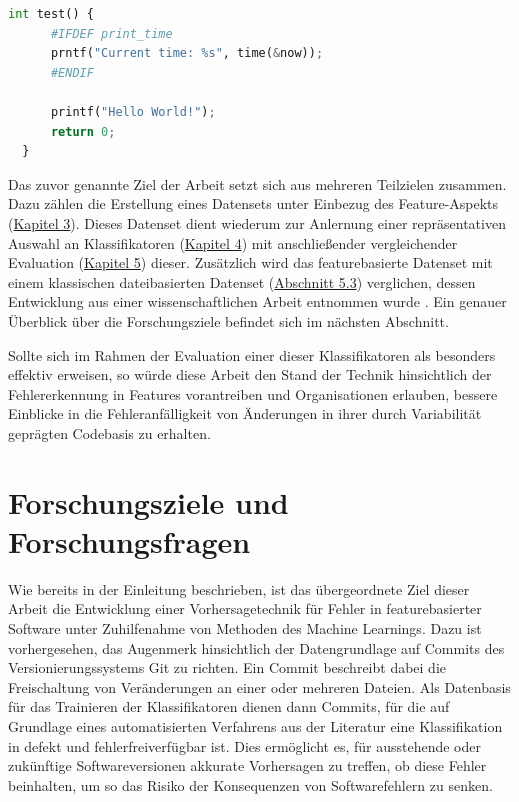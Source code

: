 \begin{lstlisting}[language=Python, caption=Exemplarische Darstellung eines fehlerhaften Features, frame=single, label=bug-code]
int test() {
	  #IFDEF print_time
	  prntf("Current time: %s", time(&now));
	  #ENDIF

	  printf("Hello World!");
	  return 0;
  }
\end{lstlisting}
 
Das zuvor genannte Ziel der Arbeit setzt sich aus mehreren Teilzielen zusammen. Dazu zählen die Erstellung eines Datensets unter Einbezug des Feature-Aspekts (\hyperref[dataset-creation]{Kapitel 3}). Dieses Datenset dient wiederum zur Anlernung einer repräsentativen Auswahl an Klassifikatoren (\hyperref[training]{Kapitel 4}) mit anschließender vergleichender Evaluation (\hyperref[evaluation]{Kapitel 5}) dieser. Zusätzlich wird das featurebasierte Datenset mit einem klassischen dateibasierten Datenset (\hyperref[classic-eval]{Abschnitt 5.3}) verglichen, dessen Entwicklung aus einer wissenschaftlichen Arbeit entnommen wurde \cite{Moser2008}. Ein genauer Überblick über die Forschungsziele befindet sich im nächsten Abschnitt.

Sollte sich im Rahmen der Evaluation einer dieser Klassifikatoren als besonders effektiv erweisen, so würde diese Arbeit den Stand der Technik hinsichtlich der Fehlererkennung in Features vorantreiben und Organisationen erlauben, bessere Einblicke in die Fehleranfälligkeit von Änderungen in ihrer durch Variabilität geprägten Codebasis zu erhalten.

\section{Forschungsziele und Forschungsfragen}

Wie bereits in der Einleitung beschrieben, ist das übergeordnete Ziel dieser Arbeit die Entwicklung einer Vorhersagetechnik für Fehler in featurebasierter Software unter Zuhilfenahme von Methoden des Machine Learnings. Dazu ist vorhergesehen, das Augenmerk hinsichtlich der Datengrundlage auf Commits des Versionierungssystems Git zu richten. Ein Commit beschreibt dabei die Freischaltung von Veränderungen an einer oder mehreren Dateien. Als Datenbasis für das Trainieren der Klassifikatoren dienen dann Commits, für die auf Grundlage eines automatisierten Verfahrens aus der Literatur eine Klassifikation in \glqq defekt\grqq{} und \glqq fehlerfrei{}\grqq verfügbar ist. Dies ermöglicht es, für ausstehende oder zukünftige Softwareversionen akkurate Vorhersagen zu treffen, ob diese Fehler beinhalten, um so das Risiko der Konsequenzen von Softwarefehlern zu senken.

